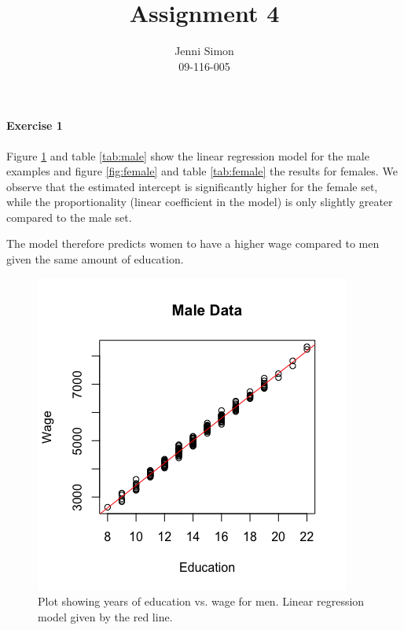 \documentclass{paper}
\title{Assignment 4}
\author{Jenni Simon\\09-116-005}
\begin{document}
\maketitle


%



\paragraph{Exercise 1}

Figure \ref{fig:male} and table \ref{tab:male} show the linear regression model
for the male examples and figure \ref{fig:female} and table \ref{tab:female} the
results for females. We observe that the estimated intercept  is significantly higher
for the female set, while the proportionality (linear coefficient in the model)
is only slightly greater compared to the male set.

The model therefore predicts women to have a higher wage compared to men given
the same amount of education.

\begin{figure}[!h]
  \begin{center}
    \quad\quad
    \includegraphics[width=.6\linewidth]{male_plot}
  \end{center}
  \caption{Plot showing years of education vs. wage for men. Linear regression
   model given by the red line.}
   \label{fig:male}
\end{figure}
\end{document}
